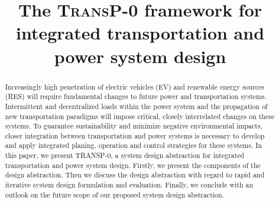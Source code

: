 \title{The \textsc{TransP-0} framework for integrated transportation and power system design}

\author{
	\and
}

\maketitle

\begin{abstract}
	Increasingly high penetration of electric vehicles (EV) and renewable energy sources (RES) will require fundamental changes to future power and transportation systems. Intermittent and decentralized loads within the power system and the propagation of new transportation paradigms will impose critical, closely interrelated changes on these systems.
	To guarantee sustainability and minimize negative environmental impacts, closer integration between transportation and power systems is necessary to develop and apply integrated planing, operation and control strategies for these systems. In this paper, we present TRANSP-0, a system design abstraction for integrated transportation and power system design. Firstly, we present the components of the design abstraction.  Then we discuss the design abstraction with regard to rapid and iterative system design formulation and evaluation. Finally, we conclude with an outlook on the future scope of our proposed system design abstraction.
\end{abstract}
